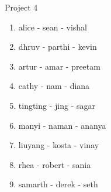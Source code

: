 Project 4\\
\begin{enumerate}
\item alice - sean - vishal
\item dhruv - parthi - kevin
\item artur - amar - preetam
\item cathy - nam - diana
\item tingting - jing - sagar
\item manyi - naman - ananya
\item liuyang - kosta - vinay
\item rhea - robert - sania
\item samarth - derek - seth
\end{enumerate}

